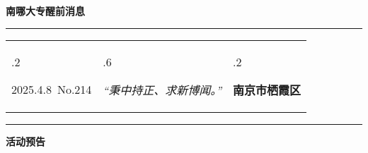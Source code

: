 \documentclass[letterpaper, 12pt]{article}
\begin{document}
\begin{center}
    \Huge\textbf{南哪大专醒前消息}
\end{center}
\vspace{4mm}
\hrule
\renewcommand\tabularxcolumn[1]{m{#1}}
\begin{tabularx}{\textwidth}{>{\hsize.2\hsize}X>{\hsize.6\hsize}X>{\hsize.2\hsize}X}
    \begin{flushleft}
        2025.4.8\, No.214
    \end{flushleft}
    &
    \begin{center}
        \textit{“秉中持正、求新博闻。”}
    \end{center}
    &
    \begin{flushright}
        \textbf{南京市栖霞区}
    \end{flushright}
\end{tabularx}
\vspace{-3.5mm}
\hrule
\vspace{4mm}
\centerline{\huge\textbf{活动预告}}
\end{document}
